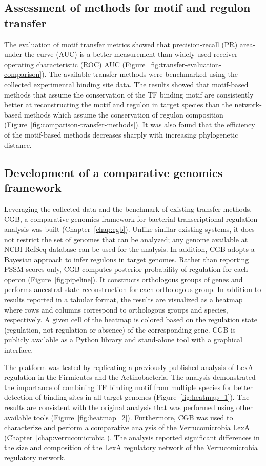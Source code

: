 \subsection{Assessment of methods for motif and regulon transfer}

The evaluation of motif transfer metrics showed that precision-recall (PR)
area-under-the-curve (AUC) is a better measurement than widely-used receiver
operating characteristic (ROC) AUC\@
(Figure~\ref{fig:transfer-evaluation-comparison}). The available transfer methods
were benchmarked using the collected experimental binding site data. The
results showed that motif-based methods that assume the conservation of the TF
binding motif are consistently better at reconstructing the motif and regulon
in target species than the network-based methods which assume the conservation
of regulon composition (Figure~\ref{fig:comparison-transfer-methods}). It was also
found that the efficiency of the motif-based methods decreases sharply with
increasing phylogenetic distance.

\subsection{Development of a comparative genomics framework}

Leveraging the collected data and the benchmark of existing transfer methods,
CGB, a comparative genomics framework for bacterial transcriptional regulation
analysis was built (Chapter~\ref{chap:cgb}). Unlike similar existing systems,
it does not restrict the set of genomes that can be analyzed; any genome
available at NCBI RefSeq database can be used for the analysis. In addition,
CGB adopts a Bayesian approach to infer regulons in target genomes. Rather than
reporting PSSM scores only, CGB computes posterior probability of regulation
for each operon (Figure~\ref{fig:pipeline}). It constructs orthologous groups
of genes and performs ancestral state reconstruction for each orthologous
group. In addition to results reported in a tabular format, the results are
visualized as a heatmap where rows and columns correspond to orthologous groups
and species, respectively. A given cell of the heatmap is colored based on the
regulation state (regulation, not regulation or absence) of the corresponding
gene. CGB is publicly available as a Python library and stand-alone tool with a
graphical interface.

The platform was tested by replicating a previously published analysis of LexA
regulation in the Firmicutes and the Actinobacteria. The analysis demonstrated
the importance of combining TF binding motif from multiple species for better
detection of binding sites in all target genomes
(Figure~\ref{fig:heatmap_1}). The results are consistent with the original
analysis that was performed using other available tools
(Figure~\ref{fig:heatmap_2}). Furthermore, CGB was used to characterize and
perform a comparative analysis of the Verrucomicrobia LexA
(Chapter~\ref{chap:verrucomicrobia}). The analysis reported significant
differences in the size and composition of the LexA regulatory network of the
Verrucomicrobia regulatory network.

